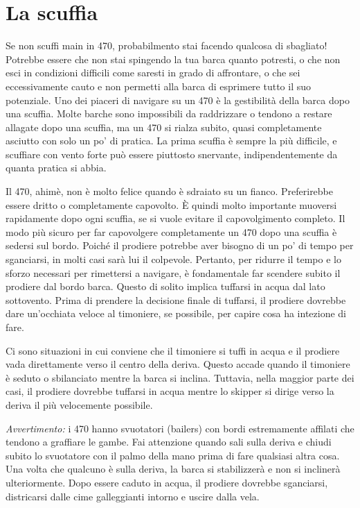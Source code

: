 
\section{La scuffia}
\label{sec:scuffia}
Se non scuffi main in 470, probabilmento stai facendo qualcosa di sbagliato!
Potrebbe essere che non stai spingendo la tua barca quanto potresti, o che non
esci in condizioni difficili come saresti in grado di affrontare, o che sei
eccessivamente cauto e non permetti alla barca di esprimere tutto il suo
potenziale. Uno dei piaceri di navigare su un 470 è la gestibilità della barca
dopo una scuffia. Molte barche sono impossibili da raddrizzare o tendono a
restare allagate dopo una scuffia, ma un 470 si rialza subito, quasi
completamente asciutto con solo un po' di pratica. La prima scuffia è sempre la
più difficile, e scuffiare con vento forte può essere piuttosto snervante,
indipendentemente da quanta pratica si abbia.

Il 470, ahimè, non è molto felice quando è sdraiato su un fianco. Preferirebbe
essere dritto o completamente capovolto. È quindi molto importante muoversi
rapidamente dopo ogni scuffia, se si vuole evitare il capovolgimento completo.
Il modo più sicuro per far capovolgere completamente un 470 dopo una scuffia è
sedersi sul bordo. Poiché il prodiere potrebbe aver bisogno di un po' di
tempo per sganciarsi, in molti casi sarà lui il colpevole. Pertanto, per ridurre
il tempo e lo sforzo necessari per rimettersi a navigare, è fondamentale far
scendere subito il prodiere dal bordo barca. Questo di solito implica tuffarsi
in acqua dal lato sottovento. Prima di prendere la decisione finale di tuffarsi,
il prodiere dovrebbe dare un'occhiata veloce al timoniere, se possibile, per
capire cosa ha intezione di fare.

Ci sono situazioni in cui conviene che il timoniere si tuffi in acqua e il
prodiere vada direttamente verso il centro della deriva. Questo accade quando il
timoniere è seduto \leeward o sbilanciato mentre la barca si inclina. Tuttavia,
nella maggior parte dei casi, il prodiere dovrebbe tuffarsi in acqua mentre lo
skipper si dirige verso la deriva il più velocemente possibile.

\emph{Avvertimento:} i 470 hanno svuotatori (bailers) con bordi estremamente
affilati che tendono a graffiare le gambe. Fai attenzione quando sali sulla
deriva e chiudi subito lo svuotatore con il palmo della mano prima di fare
qualsiasi altra cosa. Una volta che qualcuno è sulla deriva, la barca si
stabilizzerà e non si inclinerà ulteriormente. Dopo essere caduto in acqua,
il prodiere dovrebbe sganciarsi, districarsi dalle cime galleggianti intorno e
uscire dalla vela.


